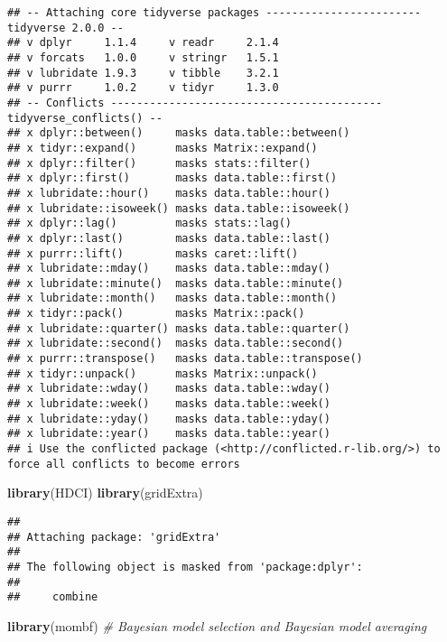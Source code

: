 \documentclass[
]{article}
\newenvironment{Shaded}{\begin{snugshade}}{\end{snugshade}}
\newcommand{\CommentTok}[1]{\textcolor[rgb]{0.56,0.35,0.01}{\textit{#1}}}
\newcommand{\FunctionTok}[1]{\textcolor[rgb]{0.13,0.29,0.53}{\textbf{#1}}}
\newcommand{\NormalTok}[1]{#1}
\begin{document}
\begin{verbatim}
## -- Attaching core tidyverse packages ------------------------ tidyverse 2.0.0 --
## v dplyr     1.1.4     v readr     2.1.4
## v forcats   1.0.0     v stringr   1.5.1
## v lubridate 1.9.3     v tibble    3.2.1
## v purrr     1.0.2     v tidyr     1.3.0
## -- Conflicts ------------------------------------------ tidyverse_conflicts() --
## x dplyr::between()     masks data.table::between()
## x tidyr::expand()      masks Matrix::expand()
## x dplyr::filter()      masks stats::filter()
## x dplyr::first()       masks data.table::first()
## x lubridate::hour()    masks data.table::hour()
## x lubridate::isoweek() masks data.table::isoweek()
## x dplyr::lag()         masks stats::lag()
## x dplyr::last()        masks data.table::last()
## x purrr::lift()        masks caret::lift()
## x lubridate::mday()    masks data.table::mday()
## x lubridate::minute()  masks data.table::minute()
## x lubridate::month()   masks data.table::month()
## x tidyr::pack()        masks Matrix::pack()
## x lubridate::quarter() masks data.table::quarter()
## x lubridate::second()  masks data.table::second()
## x purrr::transpose()   masks data.table::transpose()
## x tidyr::unpack()      masks Matrix::unpack()
## x lubridate::wday()    masks data.table::wday()
## x lubridate::week()    masks data.table::week()
## x lubridate::yday()    masks data.table::yday()
## x lubridate::year()    masks data.table::year()
## i Use the conflicted package (<http://conflicted.r-lib.org/>) to force all conflicts to become errors
\end{verbatim}

\begin{Shaded}
\begin{Highlighting}[]
\FunctionTok{library}\NormalTok{(HDCI)}
\FunctionTok{library}\NormalTok{(gridExtra)}
\end{Highlighting}
\end{Shaded}

\begin{verbatim}
## 
## Attaching package: 'gridExtra'
## 
## The following object is masked from 'package:dplyr':
## 
##     combine
\end{verbatim}

\begin{Shaded}
\begin{Highlighting}[]
\FunctionTok{library}\NormalTok{(mombf) }\CommentTok{\# Bayesian model selection and Bayesian model averaging}
\end{Highlighting}
\end{Shaded}
\end{document}
